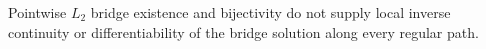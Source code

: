 Pointwise \(L_2\) bridge existence and bijectivity do not supply local inverse continuity or differentiability of the bridge solution along every regular path.